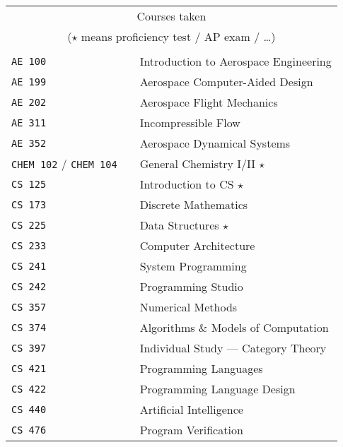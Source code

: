 \documentclass[10pt,letterpaper,sans]{moderncv}
\newcommand{\course}[2]{\texttt{#1 #2}}
\newcommand{\credit}[0]{$\star$}
\begin{document}
\begin{center}
\begin{tabular}{l p{1in} l}
  \multicolumn{3}{c}{Courses taken} \\
  \multicolumn{3}{c}{(\credit{} means proficiency test / AP exam / \ldots)} \\
  \\[3pt]
  \hline
  \course{AE}{100}     & \hfill & Introduction to Aerospace Engineering \\
  \course{AE}{199}     & \hfill & Aerospace Computer-Aided Design       \\
  \course{AE}{202}     & \hfill & Aerospace Flight Mechanics            \\
  \course{AE}{311}     & \hfill & Incompressible Flow                   \\
  \course{AE}{352}     & \hfill & Aerospace Dynamical Systems           \\
  \hline
  \course{CHEM}{102} / \course{CHEM}{104}
                       & \hfill & General Chemistry I/II \credit{}      \\
  \hline
  \course{CS}{125}     & \hfill & Introduction to CS \credit{}          \\
  \course{CS}{173}     & \hfill & Discrete Mathematics                  \\
  \course{CS}{225}     & \hfill & Data Structures \credit{}             \\
  \course{CS}{233}     & \hfill & Computer Architecture                 \\
  \course{CS}{241}     & \hfill & System Programming                    \\
  \course{CS}{242}     & \hfill & Programming Studio                    \\
  \course{CS}{357}     & \hfill & Numerical Methods                     \\
  \course{CS}{374}     & \hfill & Algorithms \& Models of Computation   \\
  \course{CS}{397}     & \hfill & Individual Study --- Category Theory  \\
  \course{CS}{421}     & \hfill & Programming Languages                 \\
  \course{CS}{422}     & \hfill & Programming Language Design           \\
  \course{CS}{440}     & \hfill & Artificial Intelligence               \\
  \course{CS}{476}     & \hfill & Program Verification                  \\

\end{tabular}
\end{center}
\end{document}
